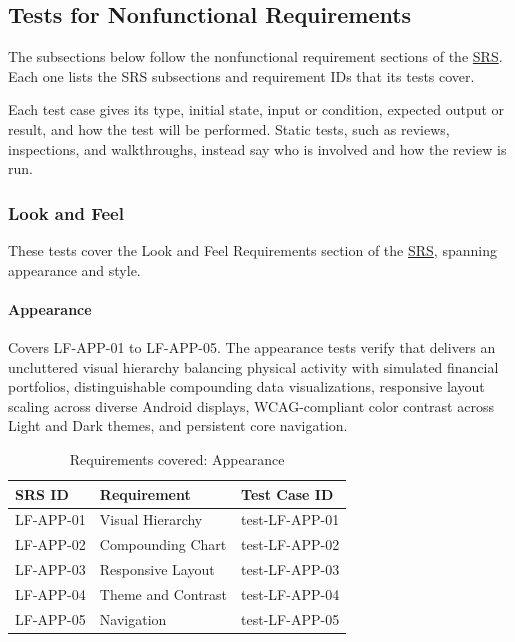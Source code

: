 \documentclass[12pt, titlepage]{article}
\begin{document}
\subsection{Tests for Nonfunctional Requirements}

The subsections below follow the nonfunctional requirement sections of the
\href{https://github.com/arjunkarthik123/fitness-finance-application/blob/main/pdfs/SRS-Volere/SRS.pdf}{SRS}. Each one lists the SRS subsections and requirement IDs that
its tests cover.

Each test case gives its type, initial state, input or condition, expected
output or result, and how the test will be performed. Static tests, such as
reviews, inspections, and walkthroughs, instead say who is involved and how the
review is run.

\subsubsection{Look and Feel}\label{sec:tests_nfr_lf}

These tests cover the Look and Feel Requirements section of the \href{https://github.com/arjunkarthik123/fitness-finance-application/blob/main/pdfs/SRS-Volere/SRS.pdf}{SRS}, spanning appearance and style.

\paragraph{Appearance}

Covers LF-APP-01 to LF-APP-05. The appearance tests verify that \progname{} delivers an uncluttered visual hierarchy balancing physical activity with simulated financial portfolios, distinguishable compounding data visualizations, responsive layout scaling across diverse Android displays, WCAG-compliant color contrast across Light and Dark themes, and persistent core navigation.

\begin{table}[H]
  \caption{Requirements covered: Appearance}
  \noindent\begin{tabularx}{\textwidth}{p{3cm}X p{3.5cm}}
  \toprule
  \textbf{SRS ID} & \textbf{Requirement} & \textbf{Test Case ID} \\
  \midrule
  LF-APP-01 & Visual Hierarchy & test-LF-APP-01 \\
  LF-APP-02 & Compounding Chart & test-LF-APP-02 \\
  LF-APP-03 & Responsive Layout & test-LF-APP-03 \\
  LF-APP-04 & Theme and Contrast & test-LF-APP-04 \\
  LF-APP-05 & Navigation & test-LF-APP-05 \\
  \bottomrule
\end{tabularx}
\end{table}
\end{document}
